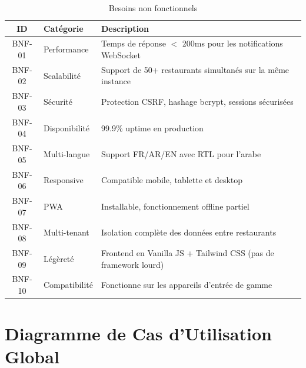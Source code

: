 \documentclass[12pt,a4paper]{report}
\begin{document}
\begin{table}[H]
    \centering
    \begin{tabularx}{\textwidth}{c l X}
        \toprule
        \rowcolor{dark!10}
        \textbf{ID} & \textbf{Catégorie} & \textbf{Description} \\
        \midrule
        BNF-01 & Performance & Temps de réponse $<$ 200ms pour les notifications WebSocket \\
        BNF-02 & Scalabilité & Support de 50+ restaurants simultanés sur la même instance \\
        BNF-03 & Sécurité & Protection CSRF, hashage bcrypt, sessions sécurisées \\
        BNF-04 & Disponibilité & 99.9\% uptime en production \\
        BNF-05 & Multi-langue & Support FR/AR/EN avec RTL pour l'arabe \\
        BNF-06 & Responsive & Compatible mobile, tablette et desktop \\
        BNF-07 & PWA & Installable, fonctionnement offline partiel \\
        BNF-08 & Multi-tenant & Isolation complète des données entre restaurants \\
        BNF-09 & Légèreté & Frontend en Vanilla JS + Tailwind CSS (pas de framework lourd) \\
        BNF-10 & Compatibilité & Fonctionne sur les appareils d'entrée de gamme \\
        \bottomrule
    \end{tabularx}
    \caption{Besoins non fonctionnels}
    \label{tab:bnf}
\end{table}

\section{Diagramme de Cas d'Utilisation Global}
\end{document}
